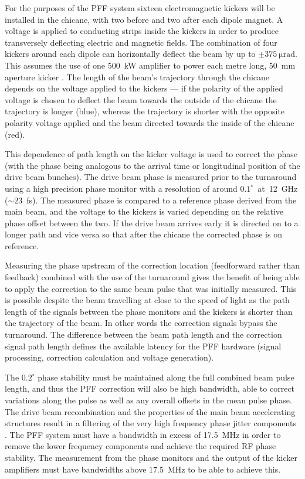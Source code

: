 For the purposes of the PFF system sixteen electromagnetic kickers will be installed in the chicane, with two before and two after each dipole magnet. A voltage is applied to conducting strips inside the kickers in order to produce transversely deflecting electric and magnetic fields. The combination of four kickers around each dipole can horizontally deflect the beam by up to \(\pm375~\mathrm{\mu rad}\). This assumes the use of one 500~kW amplifier to power each metre long, 50~mm aperture kicker \cite{clicCDR}. The length of the beam's trajectory through the chicane depends on the voltage applied to the kickers --- if the polarity of the applied voltage is chosen to deflect the beam towards the outside of the chicane the trajectory is longer (blue), whereas the trajectory is shorter with the opposite polarity voltage applied and the beam directed towards the inside of the chicane (red).

This dependence of path length on the kicker voltage is used to correct the phase (with the phase being analogous to the arrival time or longitudinal position of the drive beam bunches). The drive beam phase is measured prior to the turnaround using a high precision phase monitor with a resolution of around \(0.1^\circ\)~at~12~GHz (\(\sim23\)~fs). The measured phase is compared to a reference phase derived from the main beam, and the voltage to the kickers is varied depending on the relative phase offset between the two. If the drive beam arrives early it is directed on to a longer path and vice versa so that after the chicane the corrected phase is on reference.

Measuring the phase upstream of the correction location (feedforward rather than feedback) combined with the use of the turnaround gives the benefit of being able to apply the correction to the same beam pulse that was initially measured. This is possible  despite the beam travelling at close to the speed of light as the path length of the signals between the phase monitors and the kickers is shorter than the trajectory of the beam. In other words the correction signals bypass the turnaround. The difference between the beam path length and the correction signal path length defines the available latency for the PFF hardware (signal processing, correction calculation and voltage generation).

The \(0.2^\circ\) phase stability must be maintained along the full combined beam pulse length, and thus the PFF correction will also be high bandwidth, able to correct variations along the pulse as well as any overall offsets in the mean pulse phase. The drive beam recombination and the properties of the main beam accelerating structures result in a filtering of the very high frequency phase jitter components \cite{alexThesis}. The PFF system must have a bandwidth in excess of 17.5~MHz in order to remove the lower frequency components and achieve the required RF phase stability. The measurement from the phase monitors and the output of the kicker amplifiers must have bandwidths above 17.5~MHz to be able to achieve this.

